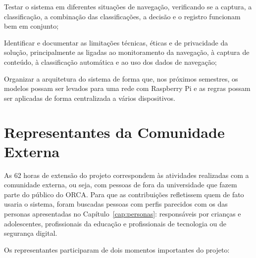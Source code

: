 \documentclass[
    12pt,           %
    oneside,        %
    a4paper,        %
    chapter=TITLE,  %
    english,        %
    brazil          %
]{abntex2}
\begin{document}
\begin{alineas}
    \item Testar o sistema em diferentes situações de navegação, verificando se a captura, a classificação, a combinação das classificações, a decisão e o registro funcionam bem em conjunto;
    \item Identificar e documentar as limitações técnicas, éticas e de privacidade da solução, principalmente as ligadas ao monitoramento da navegação, à captura de conteúdo, à classificação automática e ao uso dos dados de navegação;
    \item Organizar a arquitetura do sistema de forma que, nos próximos semestres, os modelos possam ser levados para uma rede com Raspberry Pi e as regras possam ser aplicadas de forma centralizada a vários dispositivos.
\end{alineas}

\chapter{Representantes da Comunidade Externa}

As 62 horas de extensão do projeto correspondem às atividades realizadas com a
comunidade externa, ou seja, com pessoas de fora da universidade que fazem
parte do público do ORCA. Para que as contribuições refletissem quem de fato
usaria o sistema, foram buscadas pessoas com perfis parecidos com os das
personas apresentadas no Capítulo~\ref{cap:personas}: responsáveis por
crianças e adolescentes, profissionais da educação e profissionais de
tecnologia ou de segurança digital.

Os representantes participaram de dois momentos importantes do projeto:
\end{document}
